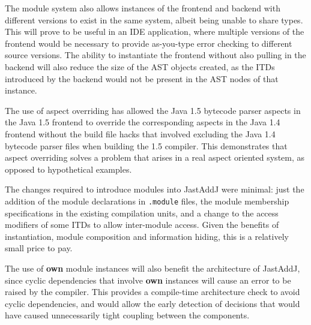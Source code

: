 The module system also allows instances of the frontend and backend with different versions
to exist in the same system, albeit being unable to share types. This will prove to be useful
in an IDE application, where multiple versions of the frontend would be necessary to provide
as-you-type error checking to different source versions. The ability to instantiate the frontend
without also pulling in the backend will also reduce the size of the AST objects created, as the
ITDs introduced by the backend would not be present in the AST nodes of that instance.

The use of aspect overriding has allowed the Java 1.5 bytecode parser aspects in the Java 1.5 frontend to
override the corresponding aspects in the Java 1.4 frontend without the build file hacks that involved
excluding the Java 1.4 bytecode parser files when building the 1.5 compiler. This demonstrates that
aspect overriding solves a problem that arises in a real aspect oriented system, as opposed to 
hypothetical examples.


The changes required to introduce modules into JastAddJ were minimal: just the addition of the module 
declarations in \texttt{.module} files, the module membership specifications in the existing compilation units,
and a change to the access modifiers of some ITDs to allow inter-module access. Given the benefits of instantiation, 
module composition and information hiding, this is a relatively small price to pay.

The use of \textbf{own} module instances will also benefit the architecture of JastAddJ,
since cyclic dependencies that involve \textbf{own} instances will cause an error to
be raised by the compiler. This provides a compile-time architecture check to avoid cyclic dependencies,
and would allow the early detection of decisions that would have caused unnecessarily
tight coupling between the components.





 
 
